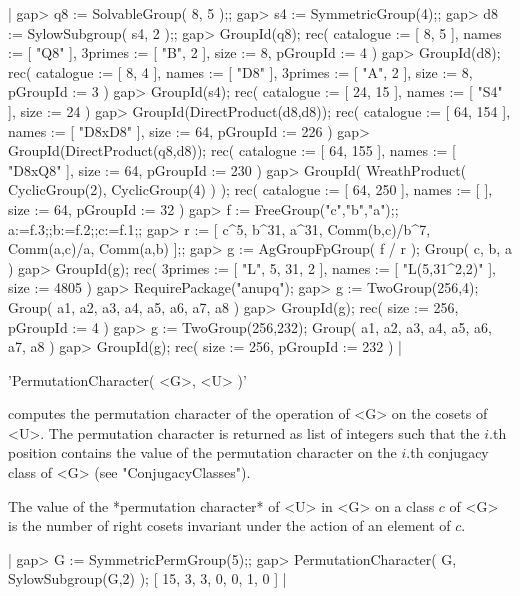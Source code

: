 |    gap> q8 := SolvableGroup( 8, 5 );;
    gap> s4 := SymmetricGroup(4);;
    gap> d8 := SylowSubgroup( s4, 2 );;
    gap> GroupId(q8);
    rec(
      catalogue := [ 8, 5 ],
      names := [ "Q8" ],
      3primes := [ "B", 2 ],
      size := 8, 
      pGroupId := 4 )
    gap> GroupId(d8);
    rec(
      catalogue := [ 8, 4 ],
      names := [ "D8" ],
      3primes := [ "A", 2 ],
      size := 8,
      pGroupId := 3 )
    gap> GroupId(s4);
    rec(
      catalogue := [ 24, 15 ],
      names := [ "S4" ],
      size := 24 )
    gap> GroupId(DirectProduct(d8,d8));
    rec(
      catalogue := [ 64, 154 ],
      names := [ "D8xD8" ],
      size := 64,
      pGroupId := 226 )
    gap> GroupId(DirectProduct(q8,d8));
    rec(
      catalogue := [ 64, 155 ],
      names := [ "D8xQ8" ],
      size := 64,
      pGroupId := 230 )
    gap> GroupId( WreathProduct( CyclicGroup(2), CyclicGroup(4) ) );
    rec(
      catalogue := [ 64, 250 ],
      names := [  ],
      size := 64,
      pGroupId := 32 )
    gap> f := FreeGroup("c","b","a");; a:=f.3;;b:=f.2;;c:=f.1;;
    gap> r := [ c^5, b^31, a^31, Comm(b,c)/b^7, Comm(a,c)/a, Comm(a,b) ];;
    gap> g := AgGroupFpGroup( f / r );
    Group( c, b, a )
    gap> GroupId(g);
    rec(
      3primes := [ "L", 5, 31, 2 ],
      names := [ "L(5,31^2,2)" ],
      size := 4805 )
    gap> RequirePackage("anupq");
    gap> g := TwoGroup(256,4);
    Group( a1, a2, a3, a4, a5, a6, a7, a8 )
    gap> GroupId(g);
    rec(
      size := 256,
      pGroupId := 4 )
    gap> g := TwoGroup(256,232);
    Group( a1, a2, a3, a4, a5, a6, a7, a8 )
    gap> GroupId(g);
    rec(
      size := 256,
      pGroupId := 232 ) |

%

'PermutationCharacter( <G>, <U> )'

computes the permutation character  of the operation of <G> on the cosets
of <U>.  The permutation character is returned  as list of  integers such
that the $i$.th position contains the  value of the permutation character
on the $i$.th conjugacy class of <G> (see "ConjugacyClasses").

The value of the *permutation character* of <U>  in <G> on a class $c$ of
<G>  is the number of  right  cosets  invariant  under  the action  of an
element of $c$.

|    gap> G := SymmetricPermGroup(5);;
    gap> PermutationCharacter( G, SylowSubgroup(G,2) );
    [ 15, 3, 3, 0, 0, 1, 0 ] |

